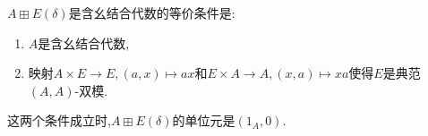 \begin{proposition}{}{}
	$A\boxplus E\left(\delta\right)$是含幺结合代数的等价条件是:
	\begin{enumerate}
		\item $A$是含幺结合代数,
		\item 映射$A\times E\to E,\left(a,x\right)\mapsto ax$和$E\times A\to A,\left(x,a\right)\mapsto xa$使得$E$是典范$\left(A,A\right)$-双模.
	\end{enumerate}
	这两个条件成立时,$A\boxplus E\left(\delta\right)$的单位元是$\left(1_{A},0\right)$.
\end{proposition}



















































